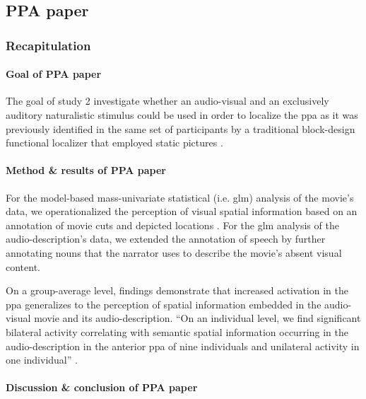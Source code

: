 \subsection{PPA paper}

\subsubsection{Recapitulation}

\paragraph{Goal of PPA paper}
The goal of study 2 investigate whether an audio-visual and an exclusively
auditory naturalistic stimulus could be used in order to localize the \ac{ppa}
as it was previously identified in the same set of participants by a traditional
block-design functional localizer that employed static pictures
\citep{sengupta2016extension}.


\paragraph{Method \& results of PPA paper}
For the model-based mass-univariate statistical (i.e. \ac{glm}) analysis of the
movie's data, we operationalized the perception of visual spatial information
based on an annotation of movie cuts and depicted locations
\citep{haeusler2016cutanno}.
For the \ac{glm} analysis of the audio-description's data, we extended the
annotation of speech \citep{haeusler2021speechanno} by further annotating nouns
that the narrator uses to describe the movie's absent visual content.

On a group-average level, findings demonstrate that increased activation in the
\ac{ppa} generalizes to the perception of spatial information embedded in the
audio-visual movie and its audio-description.
``On an individual level, we find significant bilateral activity correlating
with semantic spatial information occurring in the audio-description in the
anterior \ac{ppa} of nine individuals and unilateral activity in one
individual'' \citep{haeusler2022processing}.


\paragraph{Discussion \& conclusion of PPA paper}

